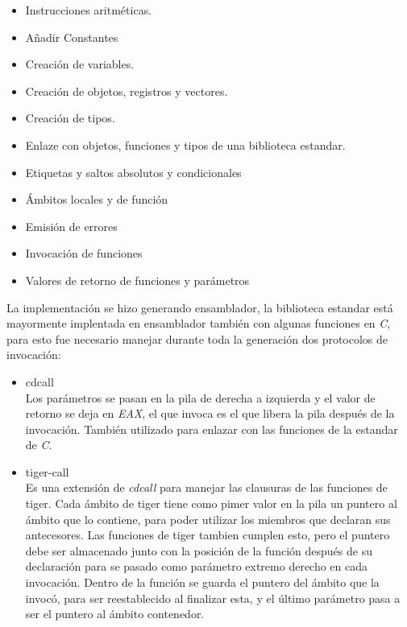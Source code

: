 \documentclass[a4paper,10pt]{article}
\begin{document}
		\begin{itemize}
			\item Instrucciones aritméticas.
			\item Añadir Constantes
			\item Creación de variables.
			\item Creación de objetos, registros y vectores.
			\item Creación de tipos.
			\item Enlaze con objetos, funciones y tipos de una biblioteca estandar.
			\item Etiquetas y saltos absolutos y condicionales
			\item Ámbitos locales y de función
			\item Emisión de errores
			\item Invocación de funciones
			\item Valores de retorno de funciones y parámetros			
		\end{itemize}
		
		La implementación se hizo generando ensamblador, la biblioteca estandar está mayormente implentada en ensamblador también con algunas funciones en \textit{C}, para esto fue necesario manejar durante toda la generación dos protocolos de invocación:
		
		\begin{itemize}
			\item cdcall\\ %
				Los parámetros se pasan en la pila de derecha a izquierda y el valor de retorno se deja en \textit{EAX}, el que invoca es el que libera la pila después de la invocación. También utilizado para enlazar con las funciones de la estandar de \textit{C}.
			\item tiger-call\\
				Es una extensión de \textit{cdcall} para manejar las clausuras de las funciones de tiger.
				Cada ámbito de tiger tiene como pimer valor en la pila un puntero al ámbito que lo contiene, para poder utilizar los miembros que declaran sus antecesores. Las funciones de tiger tambien cumplen esto, pero el puntero debe ser almacenado junto con la posición de la función después de su declaración para se pasado como parámetro extremo derecho en cada invocación. Dentro de la función se guarda el puntero del ámbito que la invocó, para ser reestablecido al finalizar esta, y el último parámetro pasa a ser el puntero al ámbito contenedor.
		\end{itemize}
		
\end{document}
